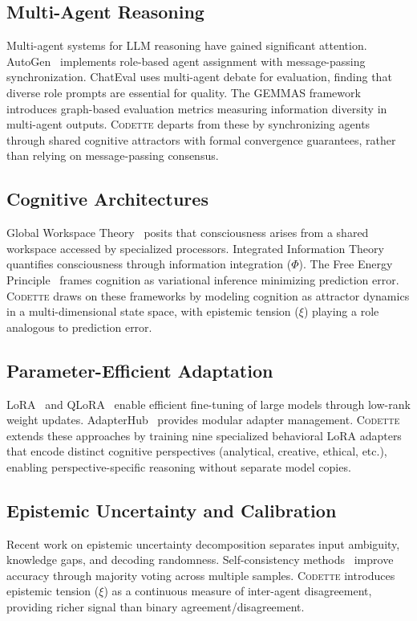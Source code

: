 \documentclass[11pt,a4paper]{article}
\newcommand{\codette}{\textsc{Codette}}
\begin{document}
\subsection{Multi-Agent Reasoning}
Multi-agent systems for LLM reasoning have gained significant attention. AutoGen~\citep{wu2023autogen} implements role-based agent assignment with message-passing synchronization. ChatEval uses multi-agent debate for evaluation, finding that diverse role prompts are essential for quality. The GEMMAS framework~\citep{wooldridge2009introduction} introduces graph-based evaluation metrics measuring information diversity in multi-agent outputs. \codette{} departs from these by synchronizing agents through shared cognitive attractors with formal convergence guarantees, rather than relying on message-passing consensus.

\subsection{Cognitive Architectures}
Global Workspace Theory~\citep{baars1997theatre} posits that consciousness arises from a shared workspace accessed by specialized processors. Integrated Information Theory~\citep{tononi2004information} quantifies consciousness through information integration ($\Phi$). The Free Energy Principle~\citep{friston2010free} frames cognition as variational inference minimizing prediction error. \codette{} draws on these frameworks by modeling cognition as attractor dynamics in a multi-dimensional state space, with epistemic tension ($\xi$) playing a role analogous to prediction error.

\subsection{Parameter-Efficient Adaptation}
LoRA~\citep{hu2021lora} and QLoRA~\citep{dettmers2023qlora} enable efficient fine-tuning of large models through low-rank weight updates. AdapterHub~\citep{pfeiffer2020adapterhub} provides modular adapter management. \codette{} extends these approaches by training nine specialized behavioral LoRA adapters that encode distinct cognitive perspectives (analytical, creative, ethical, etc.), enabling perspective-specific reasoning without separate model copies.

\subsection{Epistemic Uncertainty and Calibration}
Recent work on epistemic uncertainty decomposition separates input ambiguity, knowledge gaps, and decoding randomness. Self-consistency methods~\citep{wei2022chain} improve accuracy through majority voting across multiple samples. \codette{} introduces epistemic tension ($\xi$) as a continuous measure of inter-agent disagreement, providing richer signal than binary agreement/disagreement.
\end{document}
